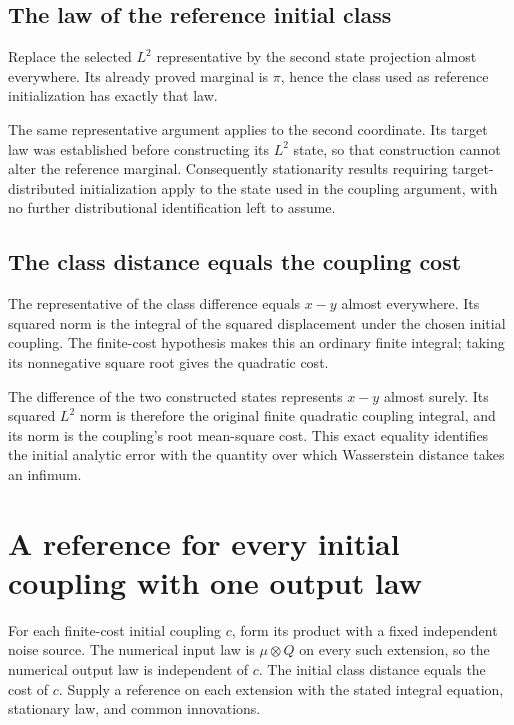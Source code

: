 \documentclass[11pt,a4paper]{article}
\begin{document}
\subsection{\texorpdfstring{The law of the reference initial class}{The law of the reference initial class}}


Replace the selected \(L^2\) representative by the second state projection almost everywhere. Its already proved marginal is \(\pi\), hence the class used as reference initialization has exactly that law.



The same representative argument applies to the second coordinate. Its target law was established before constructing its \(L^2\) state, so that construction cannot alter the reference marginal. Consequently stationarity results requiring target-distributed initialization apply to the state used in the coupling argument, with no further distributional identification left to assume.


\subsection{\texorpdfstring{The class distance equals the coupling cost}{The class distance equals the coupling cost}}


The representative of the class difference equals \(x-y\) almost everywhere. Its squared norm is the integral of the squared displacement under the chosen initial coupling. The finite-cost hypothesis makes this an ordinary finite integral; taking its nonnegative square root gives the quadratic cost.



The difference of the two constructed states represents \(x-y\) almost surely. Its squared \(L^2\) norm is therefore the original finite quadratic coupling integral, and its norm is the coupling's root mean-square cost. This exact equality identifies the initial analytic error with the quantity over which Wasserstein distance takes an infimum.


\section{\texorpdfstring{A reference for every initial coupling with one output law}{A reference for every initial coupling with one output law}}


For each finite-cost initial coupling \(c\), form its product with a fixed independent noise source. The numerical input law is \(\mu\otimes Q\) on every such extension, so the numerical output law is independent of \(c\). The initial class distance equals the cost of \(c\). Supply a reference on each extension with the stated integral equation, stationary law, and common innovations.
\end{document}

